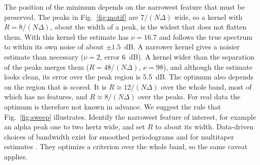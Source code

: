 \documentclass[10pt,twocolumn]{article}
\begin{document}
The position of the minimum depends on the narrowest feature that must be preserved. The peaks in Fig.~\ref{fig:motif} are $7/(N\Delta)$ wide, so a kernel with $R=8/(N\Delta)$, about the width of a peak, is the widest that does not flatten them. With this kernel the estimate has $\nu=16.7$ and follows the true spectrum to within its own noise of about $\pm1.5$~dB. A narrower kernel gives a noisier estimate than necessary ($\nu=2$, error 6~dB). A kernel wider than the separation of the peaks merges them ($R=48/(N\Delta)$, $\nu=98$), and although the estimate looks clean, its error over the peak region is 5.5~dB. The optimum also depends on the region that is scored. It is $R\approx12/(N\Delta)$ over the whole band, most of which has no features, and $R\approx8/(N\Delta)$ over the peaks. For real data the optimum is therefore not known in advance. We suggest the rule that Fig.~\ref{fig:sweep} illustrates. Identify the narrowest feature of interest, for example an alpha peak one to two hertz wide, and set $R$ to about its width. Data-driven choices of bandwidth exist for smoothed periodograms \cite{wahba1980,hurvich1985} and for multitaper estimates \cite{haley2017}. They optimize a criterion over the whole band, so the same caveat applies.
\end{document}
